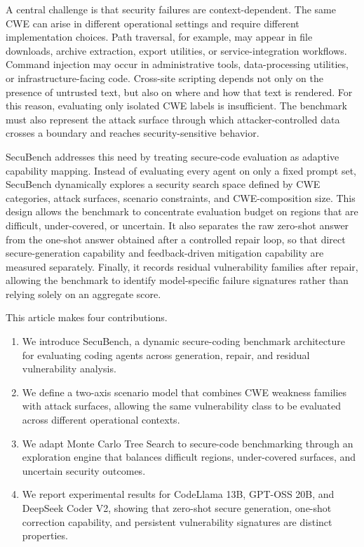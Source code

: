 \documentclass[11pt]{article}
\newcommand{\toolname}{SecuBench}
\begin{document}
A central challenge is that security failures are context-dependent. The same CWE can arise in different operational settings and require different implementation choices. Path traversal, for example, may appear in file downloads, archive extraction, export utilities, or service-integration workflows. Command injection may occur in administrative tools, data-processing utilities, or infrastructure-facing code. Cross-site scripting depends not only on the presence of untrusted text, but also on where and how that text is rendered. For this reason, evaluating only isolated CWE labels is insufficient. The benchmark must also represent the attack surface through which attacker-controlled data crosses a boundary and reaches security-sensitive behavior.

\toolname{} addresses this need by treating secure-code evaluation as adaptive capability mapping. Instead of evaluating every agent on only a fixed prompt set, \toolname{} dynamically explores a security search space defined by CWE categories, attack surfaces, scenario constraints, and CWE-composition size. This design allows the benchmark to concentrate evaluation budget on regions that are difficult, under-covered, or uncertain. It also separates the raw zero-shot answer from the one-shot answer obtained after a controlled repair loop, so that direct secure-generation capability and feedback-driven mitigation capability are measured separately. Finally, it records residual vulnerability families after repair, allowing the benchmark to identify model-specific failure signatures rather than relying solely on an aggregate score.

This article makes four contributions.
\begin{enumerate}
\item We introduce \toolname{}, a dynamic secure-coding benchmark architecture for evaluating coding agents across generation, repair, and residual vulnerability analysis.
\item We define a two-axis scenario model that combines CWE weakness families with attack surfaces, allowing the same vulnerability class to be evaluated across different operational contexts.
\item We adapt Monte Carlo Tree Search to secure-code benchmarking through an exploration engine that balances difficult regions, under-covered surfaces, and uncertain security outcomes.
\item We report experimental results for CodeLlama 13B, GPT-OSS 20B, and DeepSeek Coder V2, showing that zero-shot secure generation, one-shot correction capability, and persistent vulnerability signatures are distinct properties.
\end{enumerate}
\end{document}
